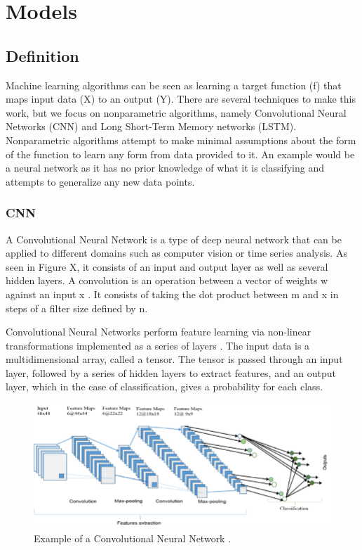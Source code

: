 \documentclass{turabian-thesis}
\newcounter{case}[section]
\begin{document}
\chapter{Models}
\label{chap:models}



\section{Definition}
Machine learning algorithms can be seen as learning a target function (f) that maps input data (X) to an output (Y). There are several techniques to make this work, but we focus on nonparametric algorithms, namely Convolutional Neural Networks (CNN) and Long Short-Term Memory networks (LSTM). Nonparametric algorithms attempt to make minimal assumptions about the form of the function to learn any form from data provided to it. An example would be a neural network as it has no prior knowledge of what it is classifying and attempts to generalize any new data points.

\subsection{CNN}

A Convolutional Neural Network is a type of deep neural network that can be applied to different domains such as computer vision or time series analysis. As seen in Figure X, it consists of an input and output layer as well as several hidden layers. A convolution is an operation between a vector of weights w against an input x \cite{yamashita_convolutional_2018}. It consists of taking the dot product between m and x in steps of a filter size defined by n.

Convolutional Neural Networks perform feature learning via non-linear transformations implemented as a series of layers \cite{aqib_smarter_2019}. The input data is a multidimensional array, called a tensor. The tensor is passed through an input layer, followed by a series of hidden layers to extract features, and an output layer, which in the case of classification, gives a probability for each class. 

\begin{figure}[h!]
   \begin{center}
      \includegraphics[scale=0.5]{../media/cnn_example.png}
   \end{center}
   \caption{Example of a Convolutional Neural Network \cite{alom_state---art_2019}.}
   \label{fig:cnn_example}
\end{figure}
\end{document}
